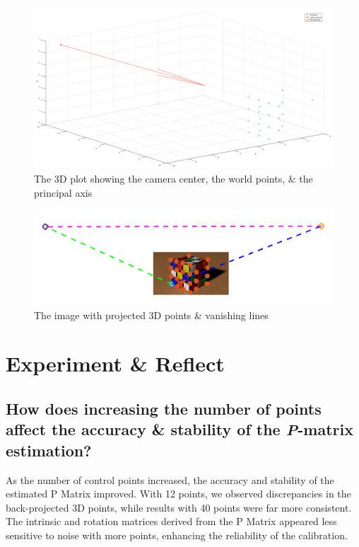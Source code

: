 \documentclass[a4paper]{article}
\begin{document}
\begin{figure}[H]
    \centering
    \includegraphics[width=\textwidth]{./images/2.2.png}
    \caption{ The 3D plot showing the camera center, the world points, \& the principal axis }
\end{figure}

\begin{figure}[H]
    \centering
    \includegraphics[width=\textwidth]{./images/2.3.png}
    \caption{ The image with projected 3D points \& vanishing lines }
\end{figure}

\section{Experiment \& Reflect}
\subsection{How does increasing the number of points affect the accuracy \& stability of the \textit{P}-matrix estimation?}
As the number of control points increased, the accuracy and stability of the estimated P Matrix improved. With 12 points, we observed discrepancies in the back-projected 3D points, while results with 40 points were far more consistent. The intrinsic and rotation matrices derived from the P Matrix appeared less sensitive to noise with more points, enhancing the reliability of the calibration.
\end{document}
